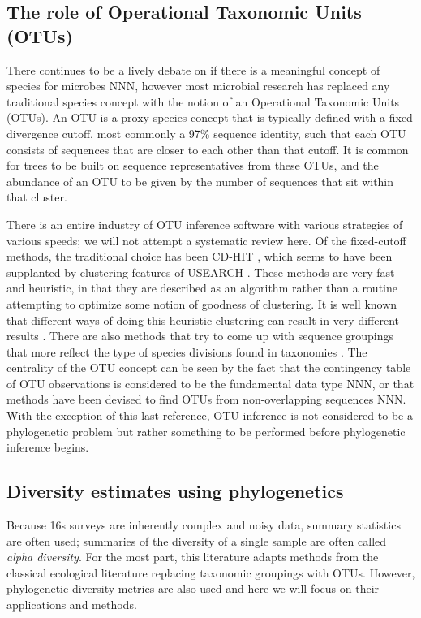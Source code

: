 \documentclass{amsart}
\begin{document}
\subsection{The role of Operational Taxonomic Units (OTUs)}
There continues to be a lively debate on if there is a meaningful concept of species for microbes NNN, however most microbial research has replaced any traditional species concept with the notion of an Operational Taxonomic Units (OTUs).
An OTU is a proxy species concept that is typically defined with a fixed divergence cutoff, most commonly a 97\% sequence identity, such that each OTU consists of sequences that are closer to each other than that cutoff.
It is common for trees to be built on sequence representatives from these OTUs, and the abundance of an OTU to be given by the number of sequences that sit within that cluster.

There is an entire industry of OTU inference software with various strategies of various speeds; we will not attempt a systematic review here.
Of the fixed-cutoff methods, the traditional choice has been CD-HIT \citep{li2006cdhit}, which seems to have been supplanted by clustering features of USEARCH \citep{edgar2010usearch}.
These methods are very fast and heuristic, in that they are described as an algorithm rather than a routine attempting to optimize some notion of goodness of clustering.
It is well known that different ways of doing this heuristic clustering can result in very different results \citep{white2010alignment}.
There are also methods that try to come up with sequence groupings that more reflect the type of species divisions found in taxonomies \citep{navlakha2009finding}.
The centrality of the OTU concept can be seen by the fact that the contingency table of OTU observations is considered to be the fundamental data type NNN, or that methods have been devised to find OTUs from non-overlapping sequences NNN.
With the exception of this last reference, OTU inference is not considered to be a phylogenetic problem but rather something to be performed before phylogenetic inference begins.


\subsection{Diversity estimates using phylogenetics}
Because 16s surveys are inherently complex and noisy data, summary statistics are often used; summaries of the diversity of a single sample are often called \emph{alpha diversity}.
For the most part, this literature adapts methods from the classical ecological literature replacing taxonomic groupings with OTUs.
However, phylogenetic diversity metrics are also used and here we will focus on their applications and methods.
\end{document}
